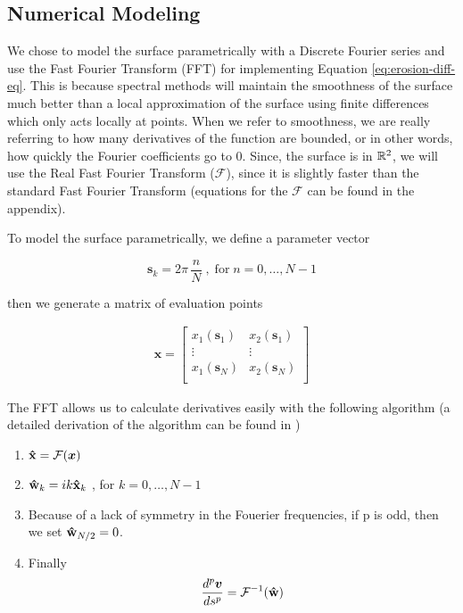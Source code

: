 \subsection*{Numerical Modeling}\label{sec:numerical-modeling}

We chose to model the surface parametrically with a Discrete Fourier series and use the Fast Fourier Transform (FFT) for implementing Equation \ref{eq:erosion-diff-eq}. This is because spectral methods will maintain the smoothness of the surface much better than a local approximation of the surface using finite differences which only acts locally at points. When we refer to smoothness, we are really referring to how many derivatives of the function are bounded, or in other words, how quickly the Fourier coefficients go to $0$. Since, the surface is in $\mathbb R^2$, we will use the Real Fast Fourier Transform ($\mathcal{F}$), since it is slightly faster than the standard Fast Fourier Transform (equations for the $\mathcal{F}$ can be found in the appendix). 

To model the surface parametrically, we define a parameter vector 

\[ \boldsymbol{s}_k = 2 \pi \, \frac{n}{N} \; , \; \text{for} \; n = 0, \dotsc, N-1 \] 

then we generate a matrix of evaluation points

\begin{align*} 
  \boldsymbol{x} = \begin{bmatrix}
    x_1(\boldsymbol{s}_1)& x_2(\boldsymbol{s}_1)\\
    \vdots& \vdots\\
    x_1(\boldsymbol{s}_N)& x_2(\boldsymbol{s}_N)\\ 
  \end{bmatrix}
\end{align*}

The FFT allows us to calculate derivatives easily with the following algorithm (a detailed derivation of the algorithm can be found in \cite{trefethen_2000})

\begin{enumerate}
  \item $\mathbf{\hat{x}} = \mathcal{F}(\boldsymbol{x})$
  \item $\mathbf{\hat{w}}_k = ik \mathbf{\hat{x}}_k$ , for $k = 0, \dotsc, N-1$
  \item Because of a lack of symmetry in the Fouerier frequencies, if p is odd, then we set $\mathbf{\hat{w}}_{N/2} = 0$.
  \item Finally
    \[
      \frac{d^p \boldsymbol{v}}{ds^p} = \mathcal{F}^{-1}(\mathbf{\hat{w}})
    \]
\end{enumerate}

